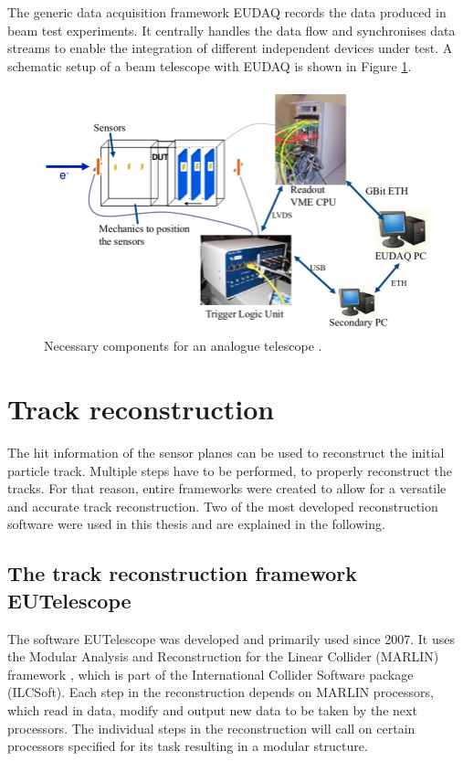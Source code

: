 The generic data acquisition framework EUDAQ \cite{eudaq} records the data produced in beam test experiments. It centrally handles the data flow and synchronises data streams to enable
the integration of different independent devices under test. A schematic setup of a beam telescope with EUDAQ is shown in Figure \ref{fig:eudaq_bild}.

\begin{figure}
  \centering
  \includegraphics[height=0.5\textwidth]{images/eudaq_2.png}
  \caption{Necessary components for an analogue telescope \cite{eudaq_bild_2}.}
  \label{fig:eudaq_bild}
\end{figure}

\chapter{Track reconstruction}
The hit information of the sensor planes can be used to reconstruct the initial particle track. Multiple steps have to
be performed, to properly reconstruct the tracks. For that reason, entire frameworks were created to allow for a versatile and accurate track reconstruction. Two of the most
developed reconstruction software were used in this thesis and are explained in the following.

\section{The track reconstruction framework EUTelescope}
The software EUTelescope was developed and
primarily used since 2007. It uses the Modular Analysis and Reconstruction for the Linear Collider (MARLIN) framework \cite{marlin}, which is part of the
International Collider Software package (ILCSoft). Each step in the reconstruction depends on MARLIN processors, which read in data, modify and output new data to be
taken by the next processors. The individual steps in the reconstruction will call on certain processors specified for its task resulting in a
modular structure.

